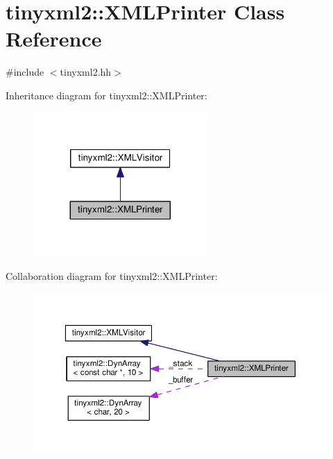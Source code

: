 \hypertarget{classtinyxml2_1_1XMLPrinter}{}\section{tinyxml2\+:\+:X\+M\+L\+Printer Class Reference}
\label{classtinyxml2_1_1XMLPrinter}


{\ttfamily \#include $<$tinyxml2.\+hh$>$}



Inheritance diagram for tinyxml2\+:\+:X\+M\+L\+Printer\+:
\nopagebreak
\begin{figure}[H]
\begin{center}
\leavevmode
\includegraphics[width=188pt]{classtinyxml2_1_1XMLPrinter__inherit__graph}
\end{center}
\end{figure}


Collaboration diagram for tinyxml2\+:\+:X\+M\+L\+Printer\+:
\nopagebreak
\begin{figure}[H]
\begin{center}
\leavevmode
\includegraphics[width=350pt]{classtinyxml2_1_1XMLPrinter__coll__graph}
\end{center}
\end{figure}
